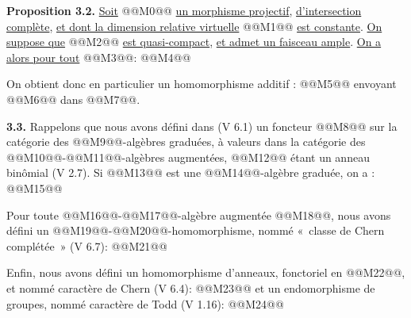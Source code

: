 
\textbf{Proposition 3.2.} \uline{Soit} @@M0@@ \uline{un morphisme projectif}, \uline{d'intersection complète}, \uline{et dont la dimension relative virtuelle} @@M1@@ \uline{est constante}. \uline{On suppose que} @@M2@@ \uline{est quasi-compact}, \uline{et admet un faisceau ample}. \uline{On a alors pour tout} @@M3@@:
@@M4@@

On obtient donc en particulier un homomorphisme additif :
@@M5@@
envoyant @@M6@@ dans @@M7@@.

\textbf{3.3.} Rappelons que nous avons défini dans (V 6.1) un foncteur @@M8@@ sur la catégorie des @@M9@@-algèbres graduées, à valeurs dans la catégorie des @@M10@@-@@M11@@-algèbres augmentées, @@M12@@ étant un anneau binômial (V 2.7). Si @@M13@@ est une @@M14@@-algèbre graduée, on a :
@@M15@@

Pour toute @@M16@@-@@M17@@-algèbre augmentée @@M18@@, nous avons défini un @@M19@@-@@M20@@-homomorphisme, nommé «~classe de Chern complétée~» (V 6.7):
@@M21@@

Enfin, nous avons défini un homomorphisme d'anneaux, fonctoriel en @@M22@@, et nommé caractère de Chern (V 6.4):
@@M23@@
et un endomorphisme de groupes, nommé caractère de Todd (V 1.16):
@@M24@@
